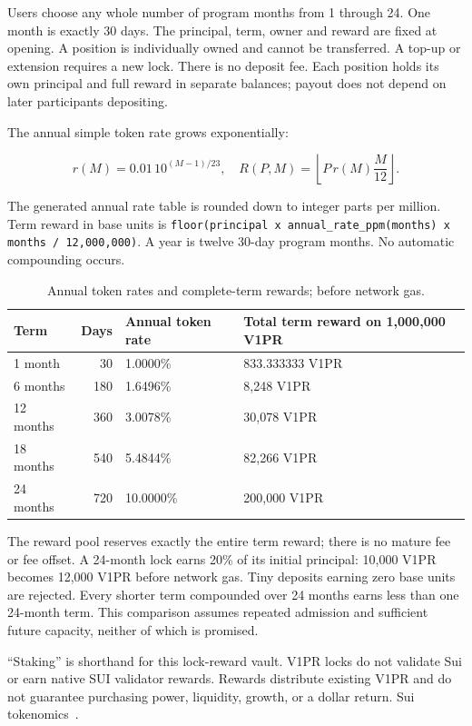 \documentclass[11pt]{article}
\begin{document}
Users choose any whole number of program months from 1 through 24. One month is exactly 30 days. The principal, term, owner and reward are fixed at opening. A position is individually owned and cannot be transferred. A top-up or extension requires a new lock. There is no deposit fee. Each position holds its own principal and full reward in separate balances; payout does not depend on later participants depositing.

The annual simple token rate grows exponentially:

\begin{equation}
r(M)=0.01\,10^{(M-1)/23},\quad R(P,M)=\left\lfloor P\,r(M)\frac{M}{12}\right\rfloor.
\end{equation}

The generated annual rate table is rounded down to integer parts per million. Term reward in base units is \texttt{floor(principal  x  annual\_rate\_ppm(months)  x  months / 12,000,000)}. A year is twelve 30-day program months. No automatic compounding occurs.

\begin{table}[H]\centering\small
\caption{Annual token rates and complete-term rewards; before network gas.}
\begin{tabularx}{\textwidth}{l r X X}
\toprule
\textbf{Term} & \textbf{Days} & \textbf{Annual token rate} & \textbf{Total term reward on 1,000,000 V1PR} \\
\midrule
1 month & 30 & 1.0000\% & 833.333333 V1PR \\
6 months & 180 & 1.6496\% & 8,248 V1PR \\
12 months & 360 & 3.0078\% & 30,078 V1PR \\
18 months & 540 & 5.4844\% & 82,266 V1PR \\
24 months & 720 & 10.0000\% & 200,000 V1PR \\
\bottomrule\end{tabularx}
\end{table}

The reward pool reserves exactly the entire term reward; there is no mature fee or fee offset. A 24-month lock earns 20\% of its initial principal: 10,000 V1PR becomes 12,000 V1PR before network gas. Tiny deposits earning zero base units are rejected. Every shorter term compounded over 24 months earns less than one 24-month term. This comparison assumes repeated admission and sufficient future capacity, neither of which is promised.

``Staking'' is shorthand for this lock-reward vault. V1PR locks do not validate Sui or earn native SUI validator rewards. Rewards distribute existing V1PR and do not guarantee purchasing power, liquidity, growth, or a dollar return. Sui tokenomics~\cite{ref3}.
\end{document}
